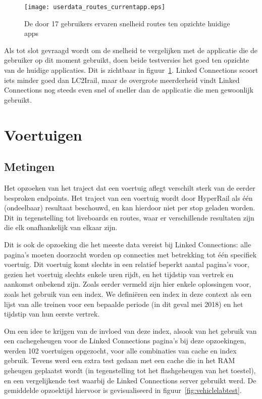 \begin{figure}[ht]
	\centering
	\texttt{[image: userdata\_routes\_currentapp.eps]}
	\caption[Door gebruikers ervaren snelheid routes tov huidige apps]{De door 17 gebruikers ervaren snelheid routes ten opzichte huidige apps }
	\label{fig:relativePerceptionRoutes}
\end{figure}

Als tot slot gevraagd wordt om de snelheid te vergelijken met de applicatie die de gebruiker op dit moment gebruikt, doen beide testversies het goed ten opzichte van de huidige applicaties. Dit is zichtbaar in figuur~\ref{fig:relativePerceptionRoutes}. Linked Connections scoort iets minder goed dan LC2Irail, maar de overgrote meerderheid vindt Linked Connections nog steeds even snel of sneller dan de applicatie die men gewoonlijk gebruikt.

\section{Voertuigen}

\subsection{Metingen}
Het opzoeken van het traject dat een voertuig aflegt verschilt sterk van de eerder besproken endpoints. Het traject van een voertuig wordt door HyperRail als één (ondeelbaar) resultaat beschouwd, en kan hierdoor niet per stop geladen worden. Dit in tegenstelling tot liveboards en routes, waar er verschillende resultaten zijn die elk onafhankelijk van elkaar zijn.

Dit is ook de opzoeking die het meeste data vereist bij Linked Connections: alle pagina's moeten doorzocht worden op connecties met betrekking tot één specifiek voertuig. Dit voertuig komt slechts in een relatief beperkt aantal pagina's voor, gezien het voertuig slechts enkele uren rijdt, en het tijdstip van vertrek en aankomst onbekend zijn. Zoals eerder vermeld %
zijn hier enkele oplossingen voor, zoals het gebruik van een index. We definiëren een index in deze context als een lijst van alle treinen voor een bepaalde periode (in dit geval mei 2018) en het tijdstip van hun eerste vertrek.

Om een idee te krijgen van de invloed van deze index, alsook van het gebruik van een cachegeheugen voor de Linked Connections pagina's bij deze opzoekingen, werden 102 voertuigen opgezocht, voor alle combinaties van cache en index gebruik. Tevens werd een extra test gedaan met een cache die in het RAM geheugen geplaatst wordt (in tegenstelling tot het flashgeheugen van het toestel), en een vergelijkende test waarbij de Linked Connections server gebruikt werd. De gemiddelde opzoektijd hiervoor is gevisualiseerd in figuur~\ref{fig:vehiclelabtest}.


